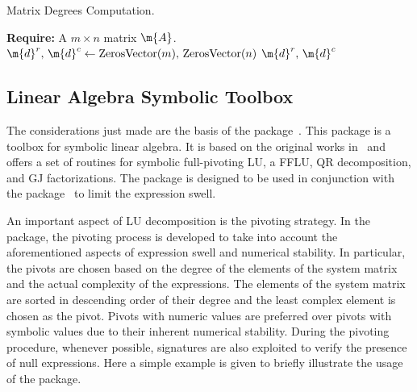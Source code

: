 \begin{breakablealgorithm}
  \caption{Matrix Degrees Computation.}
  \label{chap2:alg:compute_degrees}
  \begin{algorithmic}[1]
    \State \textbf{Require:} A $m \times n$ matrix $\m{A}$.
     
    \State $\m{d}^r, \, \m{d}^c \gets \mathrm{ZerosVector}(m), \, \mathrm{ZerosVector}(n)$ 
     
       
         
      \EndFor
    \EndFor
     
       
         
      \EndFor
    \EndFor
    \Return $\m{d}^r, \, \m{d}^c$ 
    \EndProcedure
  \end{algorithmic}
\end{breakablealgorithm}

\subsection{Linear Algebra Symbolic Toolbox}

The considerations just made are the basis of the \LAST{} package~\cite{last}. This package is a \Maple{} toolbox for symbolic linear algebra. It is based on the original works in~\cite{carette2006linear,zhou2008fraction} and offers a set of routines for symbolic full-pivoting \ac{LU}, a \ac{FFLU}, QR decomposition, and \ac{GJ} factorizations. The package \LAST{} is designed to be used in conjunction with the \LEM{} package~\cite{lem} to limit the expression swell.

An important aspect of \ac{LU} decomposition is the pivoting strategy. In the \LAST{} package, the pivoting process is developed to take into account the aforementioned aspects of expression swell and numerical stability. In particular, the pivots are chosen based on the degree of the elements of the system matrix and the actual complexity of the expressions. The elements of the system matrix are sorted in descending order of their degree and the least complex element is chosen as the pivot. Pivots with numeric values are preferred over pivots with symbolic values due to their inherent numerical stability. During the pivoting procedure, whenever possible, signatures are also exploited to verify the presence of null expressions. Here a simple example is given to briefly illustrate the usage of the \LAST{} package.

